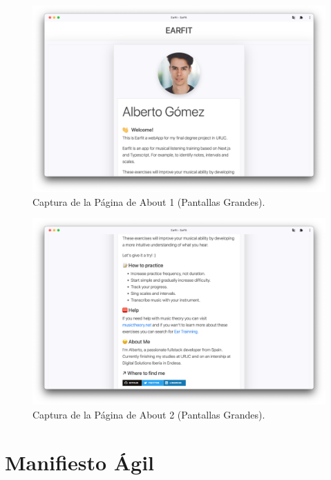 \documentclass[12pt,twoside,titlepage]{report}
\begin{document}
{\begin{figure}[H]
    \centering
    \includegraphics[scale=0.28]{Capturas Earfit/PC/About1}
    \caption{Captura de la Página de About 1 (Pantallas Grandes).}
    \label{fig:PCAbout1}
\end{figure}

\begin{figure}[H]
    \centering
    \includegraphics[scale=0.28]{Capturas Earfit/PC/About2}
    \caption{Captura de la Página de About 2 (Pantallas Grandes).}
    \label{fig:PCAbout2}
\end{figure}

\chapter{Manifiesto Ágil}

}
\end{document}
